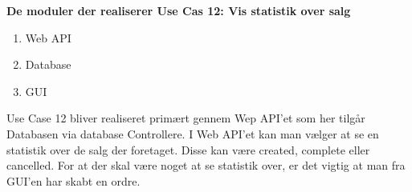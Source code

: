 \textbf{De moduler der realiserer Use Cas 12: Vis statistik over salg}

\begin{enumerate}
	\item Web API
	\item Database
	\item GUI
\end{enumerate}

Use Case 12 bliver realiseret primært gennem Wep API'et som her tilgår Databasen via database Controllere. I Web API'et kan man vælger at se en statistik over de salg der foretaget. Disse kan være created, complete eller cancelled. For at der skal være noget at se statistik over, er det vigtig at man fra GUI'en har skabt en ordre. 

